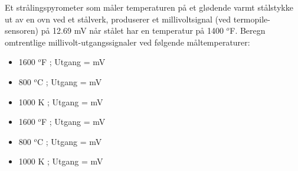 

Et strålingspyrometer som måler temperaturen på et glødende varmt stålstykke ut av en ovn ved et stålverk, produserer et millivoltsignal (ved termopile-sensoren) på 12.69 mV når stålet har en temperatur på 1400 $^{o}$F. Beregn omtrentlige millivolt-utgangssignaler ved følgende måltemperaturer:

\begin{itemize}
\item{} 1600 $^{o}$F ; Utgang = \underbar{\hskip 50pt} mV
\vskip 5pt
\item{} 800 $^{o}$C ; Utgang = \underbar{\hskip 50pt} mV
\vskip 5pt
\item{} 1000 K ; Utgang = \underbar{\hskip 50pt} mV
\end{itemize}







\begin{itemize}
\item{} 1600 $^{o}$F ; Utgang =  mV
\vskip 5pt
\item{} 800 $^{o}$C ; Utgang =  mV
\vskip 5pt
\item{} 1000 K ; Utgang =  mV
\end{itemize}











